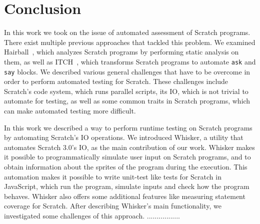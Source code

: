 
\chapter{Conclusion}
\label{cha:conclusion}


In this work we took on the issue of automated assessment of Scratch programs.
There exist multiple previous approaches that tackled this problem.
We examined Hairball~\cite{hairball}, which analyzes Scratch programs by performing static analysis on them,
as well as ITCH~\cite{itch}, which transforms Scratch programs to automate \texttt{ask} and \texttt{say} blocks.
We described various general challenges that have to be overcome in order to perform automated testing for Scratch.
These challenges include Scratch's code system, which runs parallel scripts, its IO, which is not trivial to automate for testing,
as well as some common traits in Scratch programs, which can make automated testing more difficult.
\parspace

In this work we described a way to perform runtime testing on Scratch programs by automating Scratch's IO operations.
We introduced Whisker, a utility that automates Scratch 3.0's IO, as the main contribution of our work.
Whisker makes it possible to programmatically simulate user input on Scratch programs,
and to obtain information about the sprites of the program during the execution.
This automation makes it possible to write unit-test like tests for Scratch in JavaScript,
which run the program, simulate inputs and check how the program behaves.
Whisker also offers some additional features like measuring statement coverage for Scratch.
After describing Whisker's main functionality,
we investigated some challenges of this approach.
.................
\parspace

